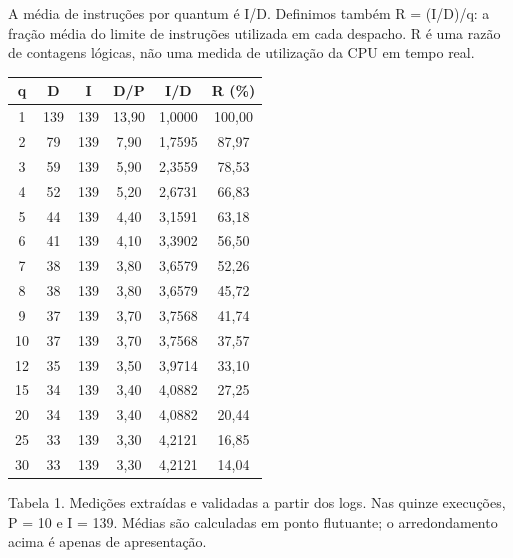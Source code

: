 \documentclass[10pt,a4paper]{article}
\begin{document}
A média de instruções por quantum é I/D. Definimos também R = (I/D)/q: a fração média do limite de instruções utilizada em cada despacho. R é uma razão de contagens lógicas, não uma medida de utilização da CPU em tempo real.

\begin{center}
\small
\begin{tabular}{cccccc}
\hline
\textbf{q} & \textbf{D} & \textbf{I} & \textbf{D/P} & \textbf{I/D} & \textbf{R (\%)} \\
\hline
1 & 139 & 139 & 13,90 & 1,0000 & 100,00 \\
2 & 79 & 139 & 7,90 & 1,7595 & 87,97 \\
3 & 59 & 139 & 5,90 & 2,3559 & 78,53 \\
4 & 52 & 139 & 5,20 & 2,6731 & 66,83 \\
5 & 44 & 139 & 4,40 & 3,1591 & 63,18 \\
6 & 41 & 139 & 4,10 & 3,3902 & 56,50 \\
7 & 38 & 139 & 3,80 & 3,6579 & 52,26 \\
8 & 38 & 139 & 3,80 & 3,6579 & 45,72 \\
9 & 37 & 139 & 3,70 & 3,7568 & 41,74 \\
10 & 37 & 139 & 3,70 & 3,7568 & 37,57 \\
12 & 35 & 139 & 3,50 & 3,9714 & 33,10 \\
15 & 34 & 139 & 3,40 & 4,0882 & 27,25 \\
20 & 34 & 139 & 3,40 & 4,0882 & 20,44 \\
25 & 33 & 139 & 3,30 & 4,2121 & 16,85 \\
30 & 33 & 139 & 3,30 & 4,2121 & 14,04 \\
\hline
\end{tabular}
\end{center}
Tabela 1. Medições extraídas e validadas a partir dos logs. Nas quinze execuções, P = 10 e I = 139. Médias são calculadas em ponto flutuante; o arredondamento acima é apenas de apresentação.

\clearpage
\end{document}
